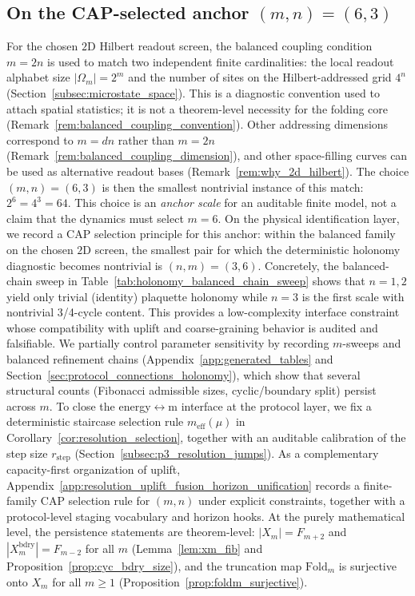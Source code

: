 \subsection{On the CAP-selected anchor \texorpdfstring{$(m,n)=(6,3)$}{(m,n)=(6,3)}}
For the chosen $2$D Hilbert readout screen, the balanced coupling condition $m=2n$ is used to match two independent finite cardinalities:
the local readout alphabet size $|\Omega_m|=2^m$ and the number of sites on the Hilbert-addressed grid $4^n$ (Section~\ref{subsec:microstate_space}).
This is a diagnostic convention used to attach spatial statistics; it is not a theorem-level necessity for the folding core (Remark~\ref{rem:balanced_coupling_convention}).
Other addressing dimensions correspond to $m=dn$ rather than $m=2n$ (Remark~\ref{rem:balanced_coupling_dimension}), and other space-filling curves can be used as alternative readout bases (Remark~\ref{rem:why_2d_hilbert}).
The choice $(m,n)=(6,3)$ is then the smallest nontrivial instance of this match:
$2^6=4^3=64$.
This choice is an \emph{anchor scale} for an auditable finite model, not a claim that the dynamics must select $m=6$.
On the physical identification layer, we record a CAP selection principle for this anchor: within the balanced family on the chosen $2$D screen, the smallest pair for which the deterministic holonomy diagnostic becomes nontrivial is $(n,m)=(3,6)$.
Concretely, the balanced-chain sweep in Table~\ref{tab:holonomy_balanced_chain_sweep} shows that $n=1,2$ yield only trivial (identity) plaquette holonomy while $n=3$ is the first scale with nontrivial 3/4-cycle content.
This provides a low-complexity interface constraint whose compatibility with uplift and coarse-graining behavior is audited and falsifiable.
We partially control parameter sensitivity by recording $m$-sweeps and balanced refinement chains (Appendix~\ref{app:generated_tables} and Section~\ref{sec:protocol_connections_holonomy}), which show that several structural counts (Fibonacci admissible sizes, cyclic/boundary split) persist across $m$.
To close the energy$\leftrightarrow$m interface at the protocol layer, we fix a deterministic staircase selection rule $m_{\mathrm{eff}}(\mu)$ in Corollary~\ref{cor:resolution_selection}, together with an auditable calibration of the step size $r_{\mathrm{step}}$ (Section~\ref{subsec:p3_resolution_jumps}).
As a complementary capacity-first organization of uplift, Appendix~\ref{app:resolution_uplift_fusion_horizon_unification} records a finite-family CAP selection rule for $(m,n)$ under explicit constraints, together with a protocol-level staging vocabulary and horizon hooks.
At the purely mathematical level, the persistence statements are theorem-level: $|X_m|=F_{m+2}$ and $|X_m^{\mathrm{bdry}}|=F_{m-2}$ for all $m$ (Lemma~\ref{lem:xm_fib} and Proposition~\ref{prop:cyc_bdry_size}), and the truncation map $\mathrm{Fold}_m$ is surjective onto $X_m$ for all $m\ge 1$ (Proposition~\ref{prop:foldm_surjective}).

